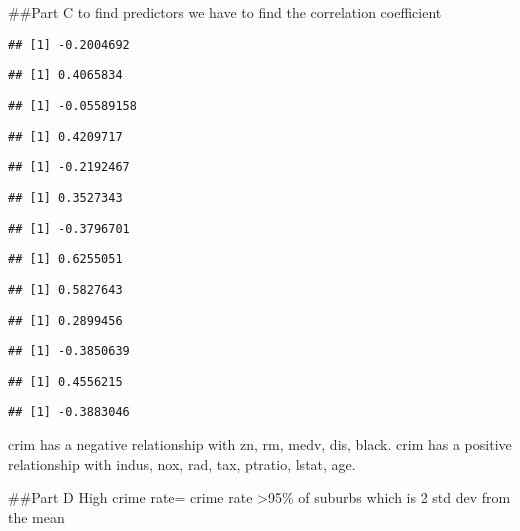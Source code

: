 \documentclass[
]{article}
\begin{document}
\#\#Part C to find predictors we have to find the correlation
coefficient

\begin{verbatim}
## [1] -0.2004692
\end{verbatim}

\begin{verbatim}
## [1] 0.4065834
\end{verbatim}

\begin{verbatim}
## [1] -0.05589158
\end{verbatim}

\begin{verbatim}
## [1] 0.4209717
\end{verbatim}

\begin{verbatim}
## [1] -0.2192467
\end{verbatim}

\begin{verbatim}
## [1] 0.3527343
\end{verbatim}

\begin{verbatim}
## [1] -0.3796701
\end{verbatim}

\begin{verbatim}
## [1] 0.6255051
\end{verbatim}

\begin{verbatim}
## [1] 0.5827643
\end{verbatim}

\begin{verbatim}
## [1] 0.2899456
\end{verbatim}

\begin{verbatim}
## [1] -0.3850639
\end{verbatim}

\begin{verbatim}
## [1] 0.4556215
\end{verbatim}

\begin{verbatim}
## [1] -0.3883046
\end{verbatim}

crim has a negative relationship with zn, rm, medv, dis, black. crim has
a positive relationship with indus, nox, rad, tax, ptratio, lstat, age.

\#\#Part D High crime rate= crime rate \textgreater95\% of suburbs which
is 2 std dev from the mean
\end{document}
